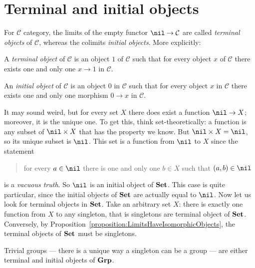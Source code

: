\section{Terminal and initial objects}

\begin{definition}
  For \(\mathcal{C}\) category, the limits of the empty functor
  \(\nil \to \mathcal{C}\) are called {\em terminal objects} of \(\mathcal{C}\),
  whereas the colimits {\em initial objects}.  More explicitly:
  \begin{tcbitem}
  \item A {\em terminal object} of \(\mathcal{C}\) is an object \(1\) of
    \(\mathcal{C}\) such that for every object \(x\) of \(\mathcal{C}\) there
    exists one and only one \(x \to 1\) in \(\mathcal{C}\).
  \item An {\em initial object} of \(\mathcal{C}\) is an object \(0\) in
    \(\mathcal{C}\) such that for every object \(x\) in \(\mathcal{C}\) there
    exists one and only one morphism \(0 \to x\) in \(\mathcal{C}\).
  \end{tcbitem}
\end{definition}

\begin{example}
  It may sound weird, but for every set \(X\) there does exist a
  function \(\nil \to X\); moreover, it is the unique one. To get this,
  think set-theoretically: a function is any subset of \(\nil \times X\) that
  has the property we know. But \(\nil \times X = \nil\), so its unique
  subset is \(\nil\). This set is a function from \(\nil\) to \(X\)
  since the statement
  \begin{quotation}
    for every \(a \in \nil\) there is one and only one \(b \in X\) such that
    \((a, b) \in \nil\)
  \end{quotation}
  is a {\em vacuous truth}. So \(\nil\) is an initial object of
  \(\mathbf{Set}\). This case is quite particular, since the initial objects of
  \(\mathbf{Set}\) are actually equal to \(\nil\). \newline Now let us look for
  terminal objects in \(\mathbf{Set}\). Take an arbitrary set \(X\): there is
  exactly one function from \(X\) to any singleton, that is singletons
  are terminal object of \(\mathbf{Set}\). Conversely, by
  Proposition~\ref{proposition:LimitsHaveIsomorphicObjects}, the
  terminal objects of \(\mathbf{Set}\) must be singletons.
\end{example}

\begin{exercise}
  Trivial groups --- there is a unique way a singleton can be a group ---
  are either terminal and initial objects of \(\mathbf{Grp}\).
\end{exercise}

